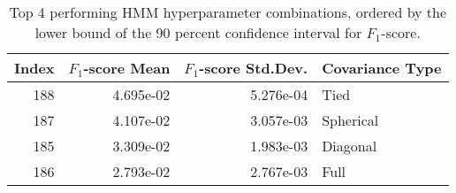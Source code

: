 \begin{table}
\caption{Top 4 performing HMM hyperparameter combinations, ordered by the lower bound of the 90 percent confidence interval for $F_1$-score.}
\label{tab:05_best_hmm_hpars}
\begin{tabular}{rrrl}
\toprule
Index & $F_1$-score Mean & $F_1$-score Std.Dev. & Covariance Type \\
\midrule
188 & 4.695e-02 & 5.276e-04 & Tied \\
187 & 4.107e-02 & 3.057e-03 & Spherical \\
185 & 3.309e-02 & 1.983e-03 & Diagonal \\
186 & 2.793e-02 & 2.767e-03 & Full \\
\bottomrule
\end{tabular}
\end{table}
